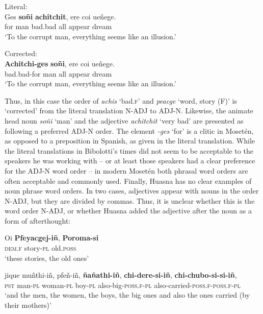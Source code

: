 \documentclass[output=paper,colorlinks,citecolor=brown
]{langscibook}
\begin{document}
\ea \label{sakel_example_17}Literal:\\
\gll Ges \textbf{soñi} \textbf{achitchit}, ere coi ueñege.\\
     for    man bad.bad all appear  dream\\
\glt ‘To the corrupt man, everything seems like an illusion.’
\z	


\ea \label{sakel_example_18}Corrected:\\
\gll \textbf{Achitchi-ges} \textbf{soñi}, ere coi ueñege.\\
     bad.bad-for    man all appear  dream\\
\glt ‘To the corrupt man, everything seems like an illusion.’
\z	

Thus, in this case the order of \textit{achis} ‘bad.\textsc{f}’ and \textit{peacge} ‘word, story (F)’ is ‘corrected’ from the literal translation N-ADJ to ADJ-N. Likewise, the animate head noun \textit{soñi} ‘man’ and the adjective \textit{achitchit} ‘very bad’ are presented as following a preferred ADJ-N order. The element \textit{-ges} ‘for’ is a clitic in Mosetén, as opposed to a preposition in Spanish, as given in the literal translation.
While the literal translations in Bibolotti’s times did not seem to be acceptable to the speakers he was working with -- or at least those speakers had a clear preference for the ADJ-N word order -- in modern Mosetén both phrasal word orders are often acceptable and commonly used.	
Finally, Huasna has no clear examples of noun phrase word orders. In two cases, adjectives appear with nouns in the order N-ADJ, but they are divided by commas. Thus, it is unclear whether this is the word order N-ADJ, or whether Huasna added the adjective after the noun as a form of afterthought:

\ea \label{sakel_example_19}
\gll Oi 		\textbf{Pfeyacgej-iñ}, 		\textbf{Poroma-si}\\
     \textsc{\textsc{dem}}.\textsc{f}	story-\textsc{pl}		old.\textsc{poss}\\
\glt ‘these stories, the old ones’
\z	

\ea \label{sakel_example_20}
\gll jique	muñthi-iñ,	pfeñ-iñ,	\textbf{ñañathi-iñ},  \textbf{chi-dere-si-iñ},		\textbf{chi-chubo-si-si-iñ},\\
     	\textsc{pst}	man-\textsc{pl}	woman-\textsc{pl}	boy-\textsc{pl}	also-big-\textsc{poss.f-pl}	also-carried-\textsc{poss.f-poss.f-pl}\\
\glt ‘and the men, the women, the boys, the big ones and also the ones carried (by their mothers)’
\z	
	
\end{document}
